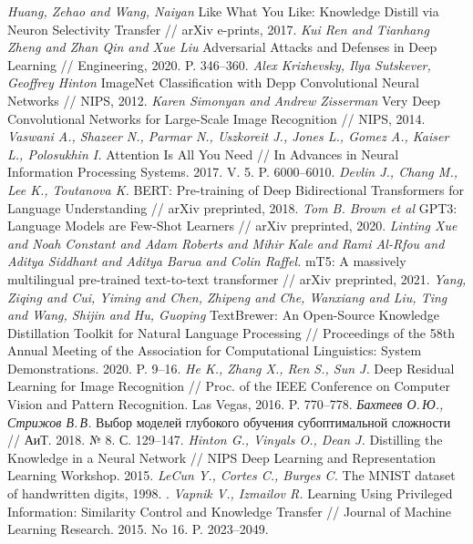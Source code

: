 \documentclass[12pt]{a&t}
\begin{document}
\begin{thebibliography}{10}
	\textit{{Huang}, Zehao and {Wang}, Naiyan} Like What You Like: Knowledge Distill via Neuron Selectivity Transfer // arXiv e-prints, 2017.
	\textit{Kui Ren and Tianhang Zheng and Zhan Qin and Xue Liu} Adversarial Attacks and Defenses in Deep Learning // Engineering, 2020. P. 346--360.
	\textit{Alex Krizhevsky, Ilya Sutskever, Geoffrey Hinton} ImageNet Classification with Depp Convolutional Neural Networks // NIPS, 2012.
	\textit{Karen Simonyan and Andrew Zisserman} Very Deep Convolutional Networks for Large-Scale Image Recognition // NIPS, 2014.
	\textit{Vaswani A., Shazeer N., Parmar N., Uszkoreit J., Jones L., Gomez A., Kaiser L., Polosukhin I.} Attention Is All You Need // In Advances in Neural Information Processing Systems. 2017. V. 5. P. 6000--6010.
       \textit{Devlin J., Chang M., Lee K., Toutanova K.} BERT: Pre-training of Deep Bidirectional Transformers for Language Understanding // arXiv preprinted, 2018.
        \textit{Tom B. Brown et al} GPT3: Language Models are Few-Shot Learners // arXiv preprinted, 2020.
        \textit{Linting Xue and Noah Constant and Adam Roberts and Mihir Kale and Rami Al-Rfou and Aditya Siddhant and Aditya Barua and Colin Raffel.} mT5: A massively multilingual pre-trained text-to-text transformer // arXiv preprinted, 2021.
        \textit{Yang, Ziqing and Cui, Yiming and Chen, Zhipeng and Che, Wanxiang and Liu, Ting and Wang, Shijin and Hu, Guoping} {T}ext{B}rewer: {A}n {O}pen-{S}ource {K}nowledge {D}istillation {T}oolkit for {N}atural {L}anguage {P}rocessing // Proceedings of the 58th Annual Meeting of the Association for Computational Linguistics: System Demonstrations.  2020. P. 9--16.
	\textit{He K., Zhang X., Ren S., Sun J.} Deep Residual Learning for Image Recognition // Proc. of the IEEE Conference on Computer Vision and Pattern Recognition. Las Vegas, 2016. P. 770--778.
	\textit{Бахтеев О.\,Ю., Стрижов В.\,В.} Выбор моделей глубокого обучения субоптимальной сложности // АиТ. 2018. № 8. С. 129--147.
        \textit{Hinton G., Vinyals O., Dean J.} Distilling the Knowledge in a Neural Network // NIPS Deep Learning and Representation Learning Workshop. 2015.
	\textit{LeCun Y.,  Cortes C., Burges C.} The MNIST dataset of handwritten digits, 1998. .
	\textit{Vapnik V., Izmailov R.} Learning Using Privileged Information: Similarity Control and Knowledge Transfer // Journal of Machine Learning Research. 2015. No 16. P. 2023--2049.

\end{thebibliography}
\end{document}
